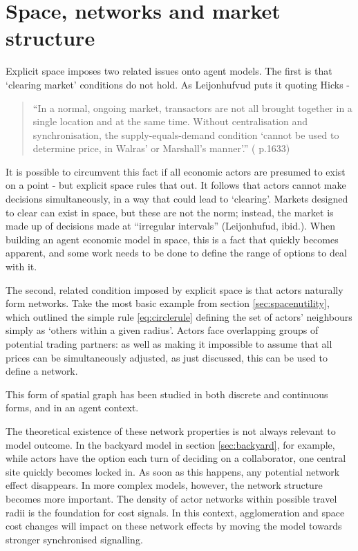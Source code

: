 \section{Space, networks and market structure \label{sec:ABM_networks}}

Explicit space imposes two related issues onto agent models. The first is that `clearing market' conditions do not hold. As Leijonhufvud puts it quoting Hicks -

\begin{quote}
``In a normal, ongoing market, transactors are not all brought together in a single location and at the same time. Without centralisation and synchronisation, the supply-equals-demand condition `cannot be used to determine price, in Walras' or Marshall's manner'.'' (\citealt{leijonhufvud_agent-based_2006} p.1633)
\end{quote}

It is possible to circumvent this fact if all economic actors are presumed to exist on a point - but explicit space rules that out. It follows that actors cannot make decisions simultaneously, in a way that could lead to `clearing'. Markets designed to clear can exist in space, but these are not the norm; instead, the market is made up of decisions made at ``irregular intervals'' (Leijonhufud, ibid.). When building an agent economic model in space, this is a fact that quickly becomes apparent, and some work needs to be done to define the range of options to deal with it. 

The second, related condition imposed by explicit space is that actors naturally form networks. Take the most basic example from section \ref{sec:spacenutility}, which outlined the simple rule \eqref{eq:circlerule} defining the set of actors' neighbours simply as `others within a given radius'. Actors face overlapping groups of potential trading partners: as well as making it impossible to assume that all prices can be simultaneously adjusted, as just discussed, this can be used to define a network.

This form of spatial graph has been studied in both discrete and continuous forms, and in an agent context.

The theoretical existence of these network properties is not always relevant to model outcome. In the backyard model in section \ref{sec:backyard}, for example, while actors have the option each turn of deciding on a collaborator, one central site quickly becomes locked in. As soon as this happens, any potential network effect disappears. In more complex models, however, the network structure becomes more important. The density of actor networks within possible travel radii is the foundation for cost signals. In this context, agglomeration and space cost changes will impact on these network effects by moving the model towards stronger synchronised signalling. 

